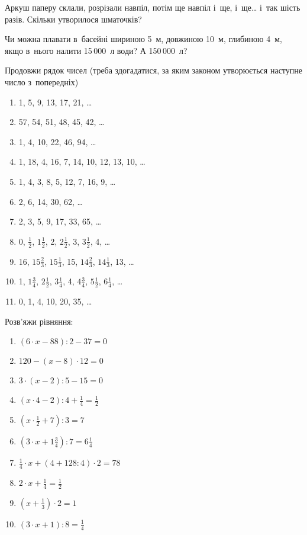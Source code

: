 \problem
Аркуш паперу склали, розрізали навпіл, потім ще навпіл і~ще, і~ще\ldots
 і~так шість разів.
Скільки утворилося шматочків?


\problem
Чи можна плавати в~басейні шириною 5~м, довжиною 10~м, глибиною 4~м,
якщо в~нього налити 15\,000~л води? А 150\,000~л?


\problem
Продовжи рядок чисел (треба здогадатися, за яким законом утворюється
наступне число з~попередніх)
\begin{enumerate}
  \item 1, 5, 9, 13, 17, 21, \ldots
  \item 57, 54, 51, 48, 45, 42, \ldots
  \item 1, 4, 10, 22, 46, 94, \ldots
  \item 1, 18, 4, 16, 7, 14, 10, 12, 13, 10, \ldots
  \item 1, 4, 3, 8, 5, 12, 7, 16, 9, \ldots
  \item 2, 6, 14, 30, 62, \ldots
  \item 2, 3, 5, 9, 17, 33, 65, \ldots
  \item 0, $\frac{1}{2}$, $1\frac{1}{2}$,
  2, $2\frac{1}{2}$, 3, $3\frac{1}{2}$, 4, \ldots
  \item 16, $15\frac{2}{3}$, $15\frac{1}{3}$, 15,
  $14\frac{2}{3}$, $14\frac{1}{3}$, 13, \ldots
  \item 1, $1\frac{3}{4}$, $2\frac{1}{2}$, $3\frac{1}{4}$,
  4, $4\frac{3}{4}$, $5\frac{1}{2}$, $6\frac{1}{4}$, \ldots
  \item 0, 1, 4, 10, 20, 35, \ldots
\end{enumerate}


\problem
Розв’яжи рівняння:
\begin{multicols}{2}
  \begin{enumerate}
    \item $(6 \cdot x - 88) : 2 - 37 = 0$
    \item $120 - (x - 8) \cdot 12 = 0$
    \item $3 \cdot (x - 2) : 5 - 15 = 0$
    \item $(x \cdot 4 - 2) : 4 + \frac{1}{4} = \frac{1}{2}$
    \item $(x \cdot \frac{1}{2} + 7) : 3 = 7$
    \item $(3 \cdot x + 1\frac{3}{4}) : 7 = 6\frac{1}{4}$
    \item $\frac{1}{4} \cdot x + (4 + 128 : 4) \cdot 2 = 78$
    \item $2 \cdot x + \frac{1}{4} = \frac{1}{2}$
    \item $(x + \frac{1}{3}) \cdot 2 = 1$
    \item $(3 \cdot x + 1) : 8 = \frac{1}{4}$
  \end{enumerate}
\end{multicols}


